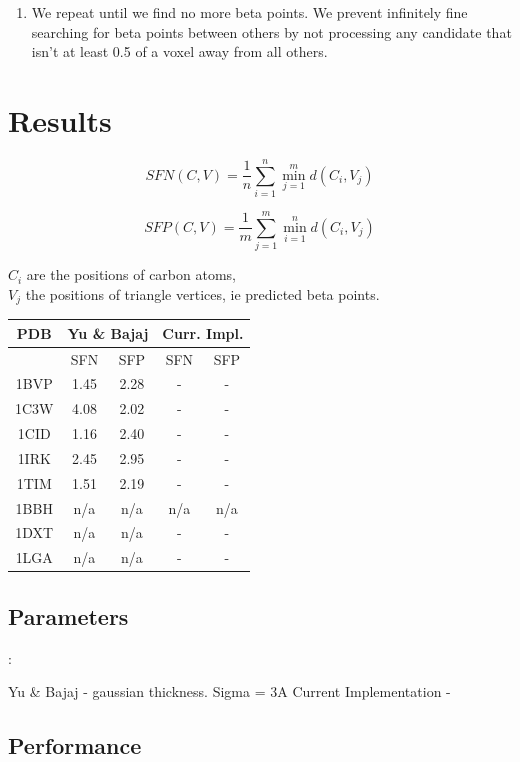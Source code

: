 \documentclass{article}
\begin{document}
\begin{enumerate}
  \item We repeat until we find no more beta points. We prevent infinitely fine
    searching for beta points between others by not processing any candidate that
    isn't at least 0.5 of a voxel away from all others.


\end{enumerate}

\section{Results}

\[
SFN(C,V) = \frac{1}{n} \sum_{i=1}^n \min_{j=1}^m d(C_i,V_j)
\]

\[
SFP(C,V) = \frac{1}{m} \sum_{j=1}^m \min_{i=1}^n d(C_i,V_j)
\]

$C_i$ are the positions of carbon atoms,\\
$V_j$ the positions of triangle vertices, ie predicted beta points.

\begin{tabular}{|c||c|c||c|c|} \hline
PDB & \multicolumn{2}{|c||}{Yu \& Bajaj} & \multicolumn{2}{|c|}{Curr. Impl.} \\
\hline
 & SFN & SFP & SFN & SFP \\
\hline
1BVP & 1.45 & 2.28 & - & - \\
\hline
1C3W & 4.08 & 2.02 & - & - \\
\hline
1CID & 1.16 & 2.40 & - & - \\
\hline
1IRK & 2.45 & 2.95 & - & - \\
\hline
1TIM & 1.51 & 2.19 & - & - \\
\hline
1BBH & n/a & n/a & n/a & n/a \\
\hline
1DXT & n/a & n/a & - & - \\
\hline
1LGA & n/a & n/a & - & - \\
\hline
\end{tabular}

\subsection{Parameters}:

Yu \& Bajaj - gaussian thickness. Sigma = 3A
Current Implementation -

\subsection{Performance}
\end{document}
